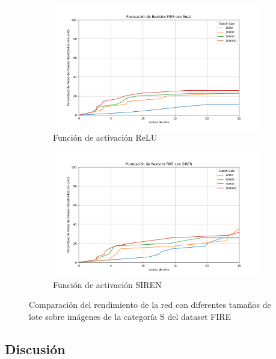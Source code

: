 \begin{figure}[tbp]
    \centering
    \begin{subfigure}[b]{0.5\textwidth}
        \centering
        \includegraphics[width=\textwidth]{imaxes/batchsize/fire_registration_scores_bs_relu_S.png}
        \caption{Función de activación ReLU}
        \label{fig:batch_size_comparison_relu}
    \end{subfigure}\hfill
    \begin{subfigure}[b]{0.5\textwidth}
        \centering
        \includegraphics[width=\textwidth]{imaxes/batchsize/fire_registration_scores_bs_siren_S.png}
        \caption{Función de activación SIREN}
        \label{fig:batch_size_comparison_siren}
    \end{subfigure}
    \caption{Comparación del rendimiento de la red con diferentes tamaños de lote sobre imágenes de la categoría S del dataset FIRE}
    \label{fig:batch_size_comparisons_fire}
\end{figure}

\subsection{Discusión}
\label{subsec:Discusion-batchsize}

